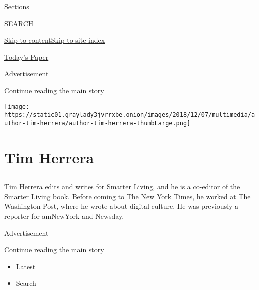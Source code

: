 Sections

SEARCH

\protect\hyperlink{site-content}{Skip to
content}\protect\hyperlink{site-index}{Skip to site index}

\href{https://myaccount.nytimes3xbfgragh.onion/auth/login?response_type=cookie\&client_id=vi}{}

\href{https://www.nytimes3xbfgragh.onion/section/todayspaper}{Today's
Paper}

Advertisement

\protect\hyperlink{after-top}{Continue reading the main story}

\texttt{[image: https://static01.graylady3jvrrxbe.onion/images/2018/12/07/multimedia/author-tim-herrera/author-tim-herrera-thumbLarge.png]}

\hypertarget{tim-herrera}{%
\section{Tim Herrera}\label{tim-herrera}}

\subsection{}

Tim Herrera edits and writes for Smarter Living, and he is a co-editor
of the Smarter Living book. Before coming to The New York Times, he
worked at The Washington Post, where he wrote about digital culture. He
was previously a reporter for amNewYork and Newsday.

Advertisement

\protect\hyperlink{after-mid1}{Continue reading the main story}

\begin{itemize}
\tightlist
\item
  \protect\hyperlink{stream-panel}{Latest}
\item
  Search
\end{itemize}

